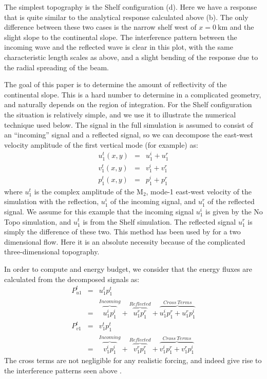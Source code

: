 \documentclass[10pt]{article}
\newcommand{\mn}[1]{{\sc #1}}
\begin{document}
The simplest topography is the \mn{Shelf} configuration (d).  Here we have a response that is quite similar to the analytical response calculated above (b).  The only difference between these two cases is the narrow shelf west of $x=0\ \mathrm{km}$ and the slight slope to the continental slope.  The interference pattern between the incoming wave and the reflected wave is clear in this plot, with the same characteristic length scales as above, and a slight bending of the response due to the radial spreading of the beam.  

The goal of this paper is to determine the amount of reflectivity of the continental slope.  This is a hard number to determine in a complicated geometry, and naturally depends on the region of integration.   For the \mn{Shelf} configuration the situation is relatively simple, and we use it to illustrate the numerical technique used below.  The signal in the full simulation is assumed to consist of an ``incoming'' signal and a reflected signal, so we can decompose the east-west velocity amplitude of the first vertical mode (for example) as:
\begin{eqnarray}
  u_{1}^{t}(x,y) &= &u_{1}^{i}+u_{1}^{r}\\
  v_{1}^{t}(x,y) &= &v_{1}^{i}+v_{1}^{r}\\
  p_{1}^{t}(x,y) &= &p_{1}^{i}+p_{1}^{r}
\end{eqnarray}
where $u_{1}^t$ is the  complex amplitude of the $\mathrm{M_2}$, mode-1 east-west velocity of the simulation with the reflection, $u_{1}^i$ of the incoming signal, and $u_{1}^r$ of the reflected signal.  We assume for this example that the incoming signal $u_{1}^i$ is given by the \mn{No Topo} simulation, and $u_{1}^t$ is from the \mn{Shelf} simulation.  The reflected signal $u_1^r$ is simply the difference of these two.  This method has been used by \citet{halletal13} for a two dimensional flow.  Here it is an absolute necessity because of the complicated three-dimensional topography.  

In order to compute and energy budget, we consider that the energy fluxes are calculated from the decomposed signals as:
\begin{eqnarray}
  P_{u1}^t & = & u_1^t p_1^t \\
  &= & \overbrace{u_1^ip_1^i}^{Incoming} + \overbrace{u_1^rp_1^r}^{Reflected} + 
  \overbrace{u_1^ip_1^r + u_1^rp_1^i}^{Cross\ Terms} \\
  P_{v1}^t & = & v_1^t p_1^t \\
  &= & \overbrace{v_1^ip_1^i}^{Incoming} + \overbrace{v_1^rp_1^r}^{Reflected} + 
  \overbrace{v_1^ip_1^r + v_1^rp_1^i}^{Cross\ Terms} 
\end{eqnarray}
The cross terms are not negligible for any realistic forcing, and indeed give rise to the interference patterns seen above \citep{nashetal04a,martinietal07}. 
\end{document}
